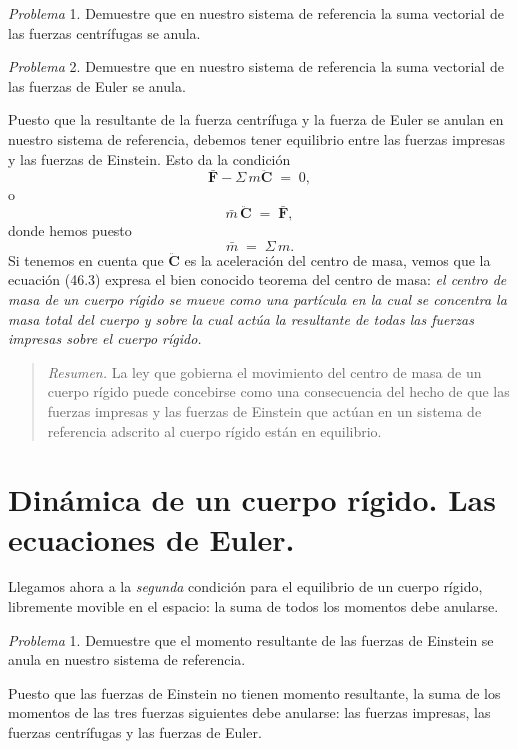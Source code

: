 \documentclass[12pt,a4paper]{book}
\begin{document}
\noindent\textit{Problema} 1. Demuestre que en nuestro sistema de referencia la suma vectorial de las fuerzas centrífugas se anula.

\noindent\textit{Problema} 2. Demuestre que en nuestro sistema de referencia la suma vectorial de las fuerzas de Euler se anula.

Puesto que la resultante de la fuerza centrífuga y la fuerza de Euler se anulan en nuestro sistema de referencia, debemos tener equilibrio entre las fuerzas impresas y las fuerzas de Einstein. Esto da la condición
\begin{equation}
\bar{\mathbf{F}} - \Sigma\, m\ddot{\mathbf{C}} \;=\; 0, \tag{46.2}
\end{equation}
o
\begin{equation}
\bar{m}\,\ddot{\mathbf{C}} \;=\; \bar{\mathbf{F}}, \tag{46.3}
\end{equation}
donde hemos puesto
\begin{equation}
\bar{m} \;=\; \Sigma\, m. \tag{46.4}
\end{equation}
Si tenemos en cuenta que $\ddot{\mathbf{C}}$ es la aceleración del centro de masa, vemos que la ecuación (46.3) expresa el bien conocido teorema del centro de masa: \textit{el centro de masa de un cuerpo rígido se mueve como una partícula en la cual se concentra la masa total del cuerpo y sobre la cual actúa la resultante de todas las fuerzas impresas sobre el cuerpo rígido.}

\begin{quote}
\textit{Resumen.} La ley que gobierna el movimiento del centro de masa de un cuerpo rígido puede concebirse como una consecuencia del hecho de que las fuerzas impresas y las fuerzas de Einstein que actúan en un sistema de referencia adscrito al cuerpo rígido están en equilibrio.
\end{quote}

\section{Dinámica de un cuerpo rígido. Las ecuaciones de Euler.}

Llegamos ahora a la \textit{segunda} condición para el equilibrio de un cuerpo rígido, libremente movible en el espacio: la suma de todos los momentos debe anularse.

\noindent\textit{Problema} 1. Demuestre que el momento resultante de las fuerzas de Einstein se anula en nuestro sistema de referencia.

Puesto que las fuerzas de Einstein no tienen momento resultante, la suma de los momentos de las tres fuerzas siguientes debe anularse: las fuerzas impresas, las fuerzas centrífugas y las fuerzas de Euler.
\end{document}
